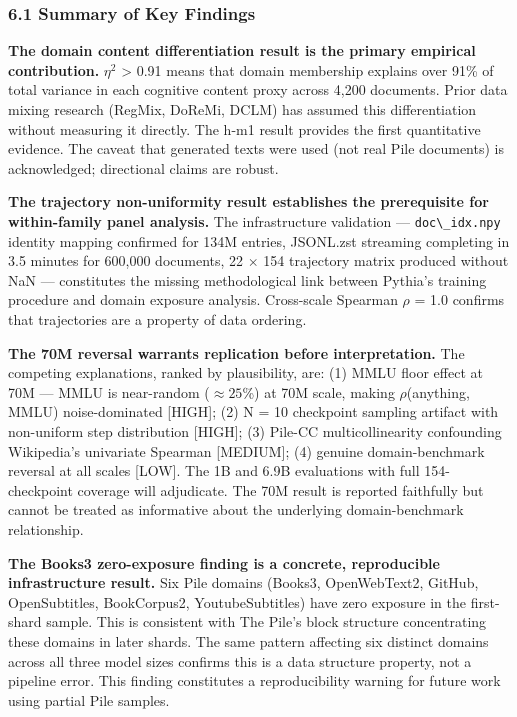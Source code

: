 
\subsubsection{6.1 Summary of Key Findings}

\textbf{The domain content differentiation result is the primary empirical contribution.} $\eta^2$ > 0.91 means that domain membership explains over 91\% of total variance in each cognitive content proxy across 4,200 documents. Prior data mixing research (RegMix, DoReMi, DCLM) has assumed this differentiation without measuring it directly. The h-m1 result provides the first quantitative evidence. The caveat that generated texts were used (not real Pile documents) is acknowledged; directional claims are robust.

\textbf{The trajectory non-uniformity result establishes the prerequisite for within-family panel analysis.} The infrastructure validation --- \texttt{doc\textbackslash \_idx.npy} identity mapping confirmed for 134M entries, JSONL.zst streaming completing in 3.5 minutes for 600,000 documents, 22 $\times$ 154 trajectory matrix produced without NaN --- constitutes the missing methodological link between Pythia's training procedure and domain exposure analysis. Cross-scale Spearman $\rho$ = 1.0 confirms that trajectories are a property of data ordering.

\textbf{The 70M reversal warrants replication before interpretation.} The competing explanations, ranked by plausibility, are: (1) MMLU floor effect at 70M --- MMLU is near-random ($\approx 25$\%) at 70M scale, making $\rho$(anything, MMLU) noise-dominated [HIGH]; (2) N = 10 checkpoint sampling artifact with non-uniform step distribution [HIGH]; (3) Pile-CC multicollinearity confounding Wikipedia's univariate Spearman [MEDIUM]; (4) genuine domain-benchmark reversal at all scales [LOW]. The 1B and 6.9B evaluations with full 154-checkpoint coverage will adjudicate. The 70M result is reported faithfully but cannot be treated as informative about the underlying domain-benchmark relationship.

\textbf{The Books3 zero-exposure finding is a concrete, reproducible infrastructure result.} Six Pile domains (Books3, OpenWebText2, GitHub, OpenSubtitles, BookCorpus2, YoutubeSubtitles) have zero exposure in the first-shard sample. This is consistent with The Pile's block structure concentrating these domains in later shards. The same pattern affecting six distinct domains across all three model sizes confirms this is a data structure property, not a pipeline error. This finding constitutes a reproducibility warning for future work using partial Pile samples.


